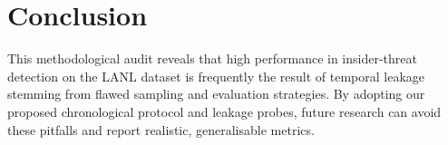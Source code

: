 \section{Conclusion}
This methodological audit reveals that high performance in insider-threat detection on the LANL dataset is frequently the result of temporal leakage stemming from flawed sampling and evaluation strategies. By adopting our proposed chronological protocol and leakage probes, future research can avoid these pitfalls and report realistic, generalisable metrics.
